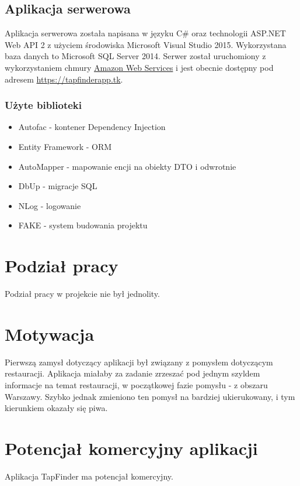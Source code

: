\documentclass[a4paper]{article}
\begin{document}
\subsection{Aplikacja serwerowa}
Aplikacja serwerowa została napisana w języku C\# oraz technologii ASP.NET Web API 2 z użyciem środowiska Microsoft Visual Studio 2015. Wykorzystana baza danych to Microsoft SQL Server 2014. Serwer został uruchomiony z wykorzystaniem chmury \href{https://aws.amazon.com/?nc2=h_lg}{Amazon Web Services} i jest obecnie dostępny pod adresem \url{https://tapfinderapp.tk}. 

\subsubsection{Użyte biblioteki}
\begin{itemize}
\item Autofac - kontener Dependency Injection
\item Entity Framework - ORM
\item AutoMapper - mapowanie encji na obiekty DTO i odwrotnie
\item DbUp - migracje SQL
\item NLog - logowanie
\item FAKE - system budowania projektu
\end{itemize}

\section{Podział pracy}

Podział pracy w projekcie nie był jednolity. 

\section{Motywacja}

Pierwszą zamysł dotyczący aplikacji był związany z pomysłem dotyczącym restauracji. Aplikacja miałaby za zadanie zrzeszać pod jednym szyldem informacje na temat restauracji, w początkowej fazie pomysłu - z obszaru Warszawy. Szybko jednak zmieniono ten pomysł na bardziej ukierukowany, i tym kierunkiem okazały się piwa. 

\section{Potencjał komercyjny aplikacji}

Aplikacja TapFinder ma potencjał komercyjny.
\end{document}
